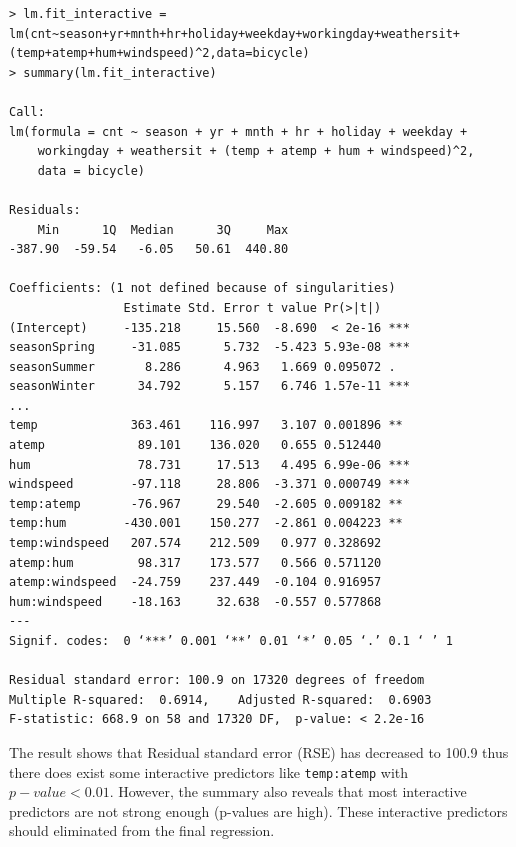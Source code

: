 \begin{lstlisting}[style=rlanguage]
> lm.fit_interactive = lm(cnt~season+yr+mnth+hr+holiday+weekday+workingday+weathersit+(temp+atemp+hum+windspeed)^2,data=bicycle)
> summary(lm.fit_interactive)

Call:
lm(formula = cnt ~ season + yr + mnth + hr + holiday + weekday +
    workingday + weathersit + (temp + atemp + hum + windspeed)^2,
    data = bicycle)

Residuals:
    Min      1Q  Median      3Q     Max
-387.90  -59.54   -6.05   50.61  440.80

Coefficients: (1 not defined because of singularities)
                Estimate Std. Error t value Pr(>|t|)
(Intercept)     -135.218     15.560  -8.690  < 2e-16 ***
seasonSpring     -31.085      5.732  -5.423 5.93e-08 ***
seasonSummer       8.286      4.963   1.669 0.095072 .
seasonWinter      34.792      5.157   6.746 1.57e-11 ***
...
temp             363.461    116.997   3.107 0.001896 **
atemp             89.101    136.020   0.655 0.512440
hum               78.731     17.513   4.495 6.99e-06 ***
windspeed        -97.118     28.806  -3.371 0.000749 ***
temp:atemp       -76.967     29.540  -2.605 0.009182 **
temp:hum        -430.001    150.277  -2.861 0.004223 **
temp:windspeed   207.574    212.509   0.977 0.328692
atemp:hum         98.317    173.577   0.566 0.571120
atemp:windspeed  -24.759    237.449  -0.104 0.916957
hum:windspeed    -18.163     32.638  -0.557 0.577868
---
Signif. codes:  0 ‘***’ 0.001 ‘**’ 0.01 ‘*’ 0.05 ‘.’ 0.1 ‘ ’ 1

Residual standard error: 100.9 on 17320 degrees of freedom
Multiple R-squared:  0.6914,	Adjusted R-squared:  0.6903
F-statistic: 668.9 on 58 and 17320 DF,  p-value: < 2.2e-16
\end{lstlisting}

The result shows that Residual standard error (RSE) has decreased to 100.9 thus there does exist some interactive predictors like \texttt{temp:atemp} with $p-value < 0.01$. However, the summary also reveals that most interactive predictors are not strong enough (p-values are high). These interactive predictors should eliminated from the final regression.

